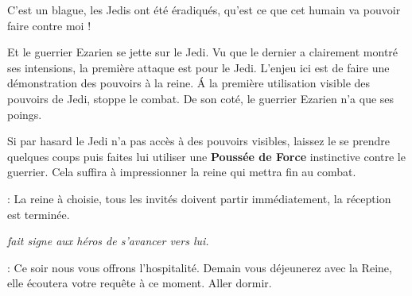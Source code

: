\begin{quotebox}
C’est un blague, les Jedis ont été éradiqués, qu’est ce que cet humain va pouvoir faire contre moi !
\end{quotebox}

Et le guerrier Ezarien se jette sur le Jedi. Vu que le dernier a clairement montré ses intensions, la première attaque est pour le Jedi. L’enjeu ici est de faire une démonstration des pouvoirs à la reine. \'A la première utilisation visible des pouvoirs de Jedi,  stoppe le combat. De son coté, le guerrier Ezarien n’a que ses poings.

Si par hasard le Jedi n’a pas accès à des pouvoirs visibles, laissez le se prendre quelques coups puis faites lui utiliser une \textbf{Poussée de Force} instinctive contre le guerrier. Cela suffira à impressionner la reine qui mettra fin au combat.

\begin{quotebox}
\noindent\textbf{}: La reine à choisie, tous les invités doivent partir immédiatement, la réception est terminée.

\emph{ fait signe aux héros de s’avancer vers lui.}

\noindent\textbf{}: Ce soir nous vous offrons l’hospitalité. Demain vous déjeunerez avec la Reine, elle écoutera votre requête à ce moment. Aller dormir.
\end{quotebox}